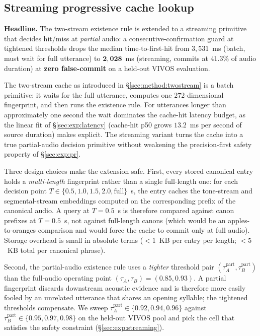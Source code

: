 \documentclass[a4paper,fleqn]{cas-dc}
\begin{document}
\subsection{Streaming progressive cache lookup}\label{sec:method:streaming}
\textbf{Headline.} The two-stream existence rule is extended to a streaming primitive that decides hit/miss at \emph{partial} audio: a consecutive-confirmation guard at tightened thresholds drops the median time-to-first-hit from $3{,}531$~ms (batch, must wait for full utterance) to $\mathbf{2{,}028}$~ms (streaming, commits at $41.3\%$ of audio duration) at \textbf{zero false-commit} on a held-out VIVOS evaluation.

The two-stream cache as introduced in \S\ref{sec:method:twostream} is a batch primitive: it waits for the full utterance, computes one $272$-dimensional fingerprint, and then runs the existence rule. For utterances longer than approximately one second the wait dominates the cache-hit latency budget, as the linear fit of \S\ref{sec:exp:latency} (cache-hit p50 grows $13.2$~ms per second of source duration) makes explicit. The streaming variant turns the cache into a true partial-audio decision primitive without weakening the precision-first safety property of \S\ref{sec:exp:pr}.

Three design choices make the extension safe. First, every stored canonical entry holds a \emph{multi-length} fingerprint rather than a single full-length one: for each decision point $T \in \{0.5, 1.0, 1.5, 2.0, \mathrm{full}\}$~s, the entry caches the tone-stream and segmental-stream embeddings computed on the corresponding prefix of the canonical audio. A query at $T = 0.5$~s is therefore compared against canon prefixes at $T = 0.5$~s, not against full-length canons (which would be an apples-to-oranges comparison and would force the cache to commit only at full audio). Storage overhead is small in absolute terms ($< 1$~KB per entry per length; $< 5$~KB total per canonical phrase).

Second, the partial-audio existence rule uses a \emph{tighter} threshold pair $(\tau^{\mathrm{part}}_A, \tau^{\mathrm{part}}_B)$ than the full-audio operating point $(\tau_A, \tau_B) = (0.85, 0.93)$. A partial fingerprint discards downstream acoustic evidence and is therefore more easily fooled by an unrelated utterance that shares an opening syllable; the tightened thresholds compensate. We sweep $\tau^{\mathrm{part}}_A \in \{0.92, 0.94, 0.96\}$ against $\tau^{\mathrm{part}}_B \in \{0.95, 0.97, 0.98\}$ on the held-out VIVOS pool and pick the cell that satisfies the safety constraint (\S\ref{sec:exp:streaming}).
\end{document}
